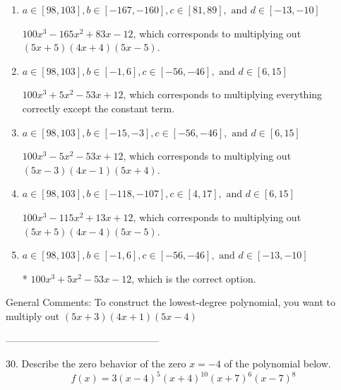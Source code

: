 \documentclass{article}[14pt]
\begin{document}
\begin{enumerate}[label=\Alph*.] 
\item $ a \in [98, 103], b \in [-167, -160], c \in [81, 89], \text{ and } d \in [-13, -10] $ 

 $100x^{3} -165 x^{2} +83 x -12$, which corresponds to multiplying out $(5x + 5)(4x + 4)(5x -5)$. 
\item $ a \in [98, 103], b \in [-1, 6], c \in [-56, -46], \text{ and } d \in [6, 15] $ 

 $100x^{3} +5 x^{2} -53 x + 12$, which corresponds to multiplying everything correctly except the constant term. 
\item $ a \in [98, 103], b \in [-15, -3], c \in [-56, -46], \text{ and } d \in [6, 15] $ 

 $100x^{3} -5 x^{2} -53 x + 12$, which corresponds to multiplying out $(5x -3)(4x -1)(5x + 4)$. 
\item $ a \in [98, 103], b \in [-118, -107], c \in [4, 17], \text{ and } d \in [6, 15] $ 

 $100x^{3} -115 x^{2} +13 x + 12$, which corresponds to multiplying out $(5x + 5)(4x -4)(5x -5)$. 
\item $ a \in [98, 103], b \in [-1, 6], c \in [-56, -46], \text{ and } d \in [-13, -10] $ 

 * $100x^{3} +5 x^{2} -53 x -12$, which is the correct option. 
\end{enumerate} 
 
General Comments: To construct the lowest-degree polynomial, you want to multiply out $(5x + 3)(4x + 1)(5x -4)$

-----------------------------------------------

30. Describe the zero behavior of the zero $x = -4$ of the polynomial below.
$$ f(x) = 3(x - 4)^{5}(x + 4)^{10}(x + 7)^{6}(x - 7)^{8} $$ 
\end{document}
